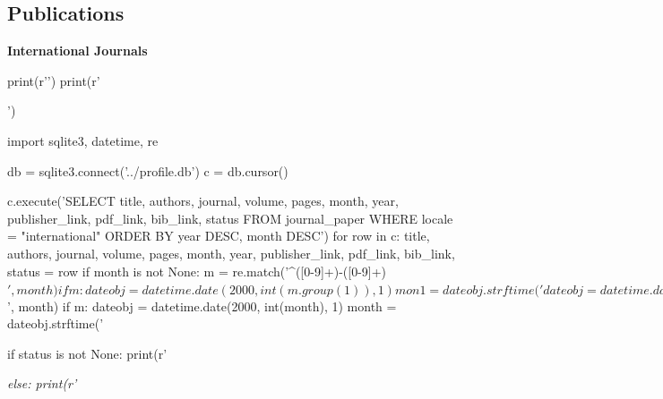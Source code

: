 \documentclass[margin,line]{res}
\newenvironment{list1}{
  \begin{list}{\ding{113}}{%
      \setlength{\itemsep}{0in}
      \setlength{\parsep}{0in} \setlength{\parskip}{0in}
      \setlength{\topsep}{0in} \setlength{\partopsep}{0in}
      \setlength{\leftmargin}{0.17in}}}{\end{list}}
\begin{document}
\begin{resume}



\section{\sc Publications}
{\bf International Journals}\\

\begin{pycode}
print(r'\vspace{-.3cm}')
print(r'\begin{list1}')

import sqlite3, datetime, re

db = sqlite3.connect('../profile.db')
c = db.cursor()

c.execute('SELECT title, authors, journal, volume, pages, month, year, publisher_link, pdf_link, bib_link, status FROM journal_paper WHERE locale = "international" ORDER BY year DESC, month DESC')
for row in c:
  title, authors, journal, volume, pages, month, year, publisher_link, pdf_link, bib_link, status = row
  if month is not None:
    m = re.match('^([0-9]+)-([0-9]+)$', month)
    if m:
      dateobj = datetime.date(2000, int(m.group(1)), 1)
      mon1 = dateobj.strftime('%
      dateobj = datetime.date(2000, int(m.group(2)), 1)
      mon2 = dateobj.strftime('%
      month = ', %
    else:
      m = re.match('^[0-9]+$', month)
      if m:
        dateobj = datetime.date(2000, int(month), 1)
        month = dateobj.strftime('%

  if status is not None:
    print(r'\item[] {\em %
  else:
    print(r'\item[] {\em %

}}
\end{list1}
\end{pycode}
\end{resume}
\end{document}
